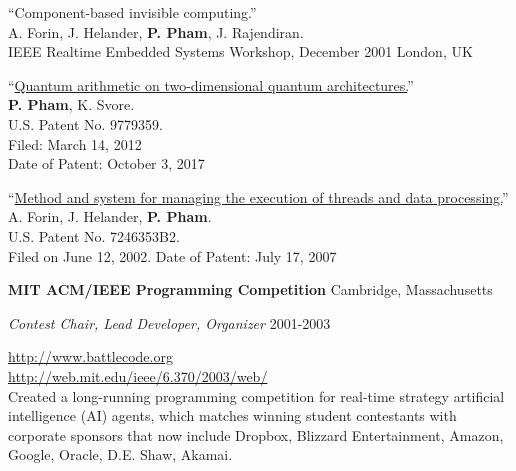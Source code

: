 \documentclass[letter]{article}
\begin{document}
\vspace{\baselineskip}
\par
``Component-based invisible computing.''\\
A. Forin, J. Helander, \textbf{P. Pham}, J. Rajendiran.\\
IEEE Realtime Embedded Systems Workshop, December 2001 \hfill London, UK


\vspace{\baselineskip}

``\href{https://patents.justia.com/patent/9779359}{Quantum arithmetic on two-dimensional quantum architectures.}''
\\
\textbf{P. Pham}, K. Svore.\\
U.S. Patent No. 9779359.\\
Filed: March 14, 2012\\
Date of Patent: October 3, 2017\\

\vspace{0.5\baselineskip}

``\href{https://patents.google.com/patent/US7246353}{Method and system for managing the execution of threads and data processing.}''\\
A. Forin, J. Helander, \textbf{P. Pham}.\\
U.S. Patent No. 7246353B2.\\
Filed on June 12, 2002.
Date of Patent: July 17, 2007\\


\vspace{\baselineskip}

{\bf MIT ACM/IEEE Programming Competition} \hfill Cambridge, Massachusetts

{\em Contest Chair, Lead Developer, Organizer} \hfill 2001-2003
\vspace{0.5\baselineskip}
\par

\url{http://www.battlecode.org}\\
\url{http://web.mit.edu/ieee/6.370/2003/web/}\\
Created a long-running
programming competition for real-time strategy artificial intelligence
(AI) agents, which matches winning student contestants with corporate
sponsors that now include
Dropbox, Blizzard Entertainment, Amazon, Google, Oracle, D.E. Shaw, Akamai.
\end{document}
